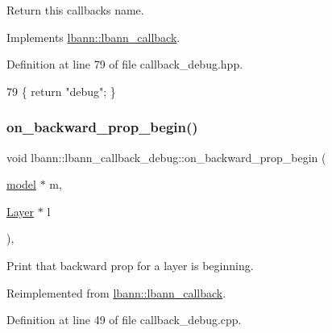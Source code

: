 Return this callback\textquotesingle{}s name. 

Implements \hyperlink{classlbann_1_1lbann__callback_a7522c7a14f1d6a1ea762cc2d7248eb3a}{lbann\+::lbann\+\_\+callback}.



Definition at line 79 of file callback\+\_\+debug.\+hpp.


\begin{DoxyCode}
79 \{ \textcolor{keywordflow}{return} \textcolor{stringliteral}{"debug"}; \}
\end{DoxyCode}
\mbox{\label{classlbann_1_1lbann__callback__debug_adaf60c995d2638a40d9c87a923c53865}} 
\subsubsection{\texorpdfstring{on\+\_\+backward\+\_\+prop\+\_\+begin()}{on\_backward\_prop\_begin()}}
{\footnotesize\ttfamily void lbann\+::lbann\+\_\+callback\+\_\+debug\+::on\+\_\+backward\+\_\+prop\+\_\+begin (\begin{DoxyParamCaption}\item[{\hyperlink{classlbann_1_1model}{model} $\ast$}]{m,  }\item[{\hyperlink{classlbann_1_1Layer}{Layer} $\ast$}]{l }\end{DoxyParamCaption})\hspace{0.3cm}{\ttfamily [override]}, {\ttfamily [virtual]}}

Print that backward prop for a layer is beginning. 

Reimplemented from \hyperlink{classlbann_1_1lbann__callback_abeb1e486e259fd358332abf1e952f630}{lbann\+::lbann\+\_\+callback}.



Definition at line 49 of file callback\+\_\+debug.\+cpp.


